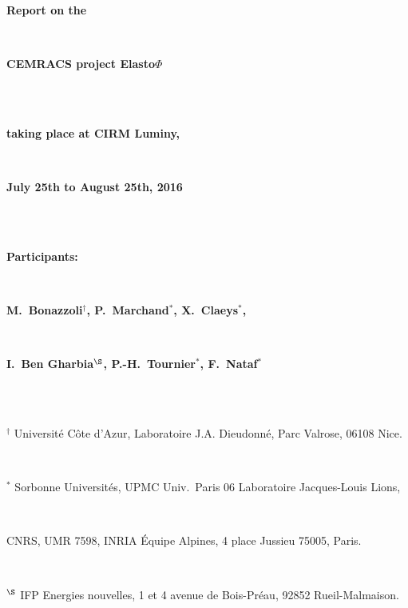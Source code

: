 

\thispagestyle{empty}

\centerline{\textbf{\huge Report on the}}
\quad\\[5pt]
\centerline{\textbf{\huge CEMRACS project Elasto$\Phi$}}
\quad\\[5pt]
\vspace{1cm}
\quad\\
\centerline{\textbf{\Large taking place at CIRM Luminy,}}\quad\\[5pt]
\centerline{\textbf{\Large July 25th to August 25th, 2016}}\quad\\[5pt]
\vspace{1cm}
\quad\\
\centerline{\textbf{\Large Participants:}}\quad\\[15pt]
\centerline{\textbf{\Large M.~Bonazzoli$^{\dagger}$, P.~Marchand$^{*}$, X.~Claeys$^{*}$,}}\quad\\[5pt]
\centerline{\textbf{\Large I.~Ben Gharbia$^{\S}$, P.-H.~Tournier$^{*}$, F.~Nataf$^{*}$}}\quad\\[5pt]
\vspace{0.25cm}\quad\\
\centerline{$^{\dagger}$ Universit\'e C\^ote d'Azur, Laboratoire J.A. Dieudonn\'e, Parc Valrose, 06108 Nice.}\,\\
\centerline{$^{*}$ Sorbonne Universit\'es, UPMC Univ.~Paris 06 Laboratoire Jacques-Louis Lions,}\,\\
\centerline{CNRS, UMR 7598, INRIA \'Equipe Alpines, 4 place Jussieu 75005, Paris.}\,\\
\centerline{$^{\S}$ IFP Energies nouvelles, 1 et 4 avenue de Bois-Pr\'eau, 92852 Rueil-Malmaison.}



